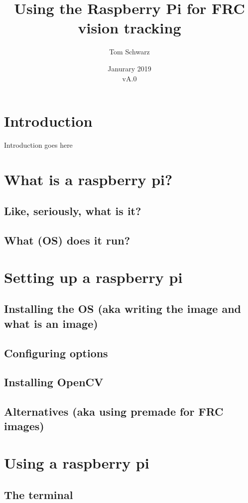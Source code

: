 \documentclass[11pt, titlepage]{article}
\title{Using the Raspberry Pi for FRC vision tracking}
\author{Tom Schwarz}
\date{Janurary 2019\\vA.0} %
\begin{document}
\maketitle

\tableofcontents

\section{Introduction}
Introduction goes here
\pagebreak

\section{What is a raspberry pi?}
\subsection{Like, seriously, what is it?}
\subsection{What (OS) does it run?}

\section{Setting up a raspberry pi}
\subsection{Installing the OS (aka writing the image and what is an image)}
\subsection{Configuring options}
\subsection{Installing OpenCV}
\subsection{Alternatives (aka using premade for FRC images)}

\section{Using a raspberry pi}
\subsection{The terminal}
\end{document}

